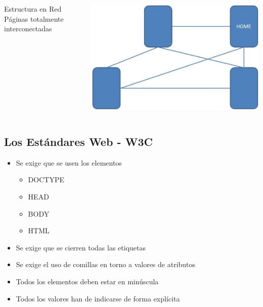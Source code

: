 \documentclass{beamer}
\begin{document}
\begin{frame}
  \begin{columns}[c]
	\begin{block}{Estructura en Red}
	Páginas totalmente interconectadas
	\end{block}

	\begin{center}
	\includegraphics[scale=.3]{images/EstructuraRed.JPG} 
	\end{center}
  \end{columns}
\end{frame}

	\subsection{Los Estándares Web - W3C}
\begin{frame}
\begin{itemize}
\item Se exige que se usen los elementos
	\begin{itemize}
	\item DOCTYPE
	\item HEAD
	\item BODY 
	\item HTML
	\end{itemize}
\item Se exige que se cierren todas las etiquetas
\item Se exige el uso de comillas en torno a valores de atributos
\item Todos los elementos deben estar en minúscula
\item Todos los valores han de indicarse de forma explícita
\end{itemize}
\end{frame}
\end{document}
